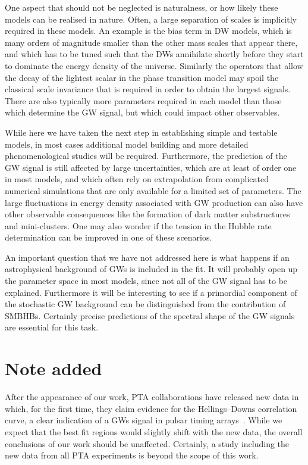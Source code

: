 \documentclass{article}
\begin{document}
One aspect that should not be neglected is naturalness, or how likely these models can be realised in nature. Often, a large separation of scales is implicitly required in these models. An example is the bias term in DW models, which is many orders of magnitude smaller than the other mass scales that appear there, and which has to be tuned such that the DWs annihilate shortly before they start to dominate the energy density of the universe. Similarly the operators that allow the decay of the lightest scalar in the phase transition model may spoil the classical scale invariance that is required in order to obtain the largest signals. There are also typically more parameters required in each model than those which determine the GW signal, but which could impact other observables.  

While here we have taken the next step in establishing simple and testable models, in most cases additional model building and more detailed phenomenological studies will be required. Furthermore, the prediction of the GW signal is still affected by large uncertainties, which are at least of order one in most models, and which often rely on extrapolation from complicated numerical simulations that are only available for a limited set of parameters. The large fluctuations in energy density associated with GW production can also have other observable consequences like the formation of dark matter substructures and mini-clusters. One may also wonder if the tension in the Hubble rate determination can be improved in one of these scenarios. 

An important question that we have not addressed here is what happens if an astrophysical background of GWs is included in the fit. It will probably open up the parameter space in most models, since not all of the GW signal has to be explained. Furthermore it will be interesting to see if a primordial component of the stochastic GW background can be distinguished from the contribution of SMBHBs. Certainly precise predictions of the spectral shape of the GW signals are essential for this task. 




\section*{Note added}

After the appearance of our work, PTA collaborations have released new data in which, for the first time, they claim evidence for the Hellings–Downs correlation curve, a clear indication of a GWs signal in pulsar timing arrays~\cite{NANOGrav:2023gor, NANOGrav:2023hvm, Antoniadis:2023ott, Antoniadis:2023xlr, Reardon:2023gzh, Xu:2023wog}.
While we expect that the best fit regions would slightly shift with the new data, the overall conclusions of our work should be unaffected. Certainly, a study including the new data from all PTA experiments is beyond the scope of this work.
\end{document}
